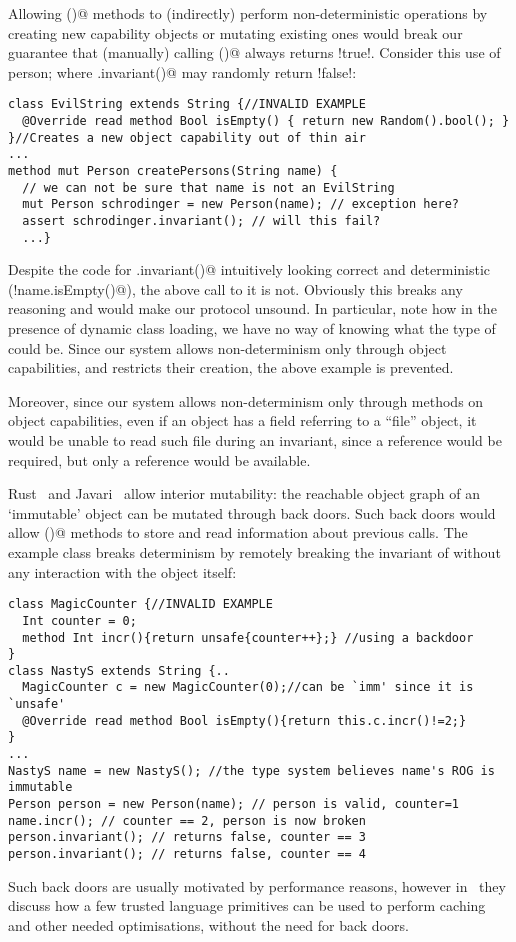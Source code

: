 Allowing \Q@invariant()@ methods to (indirectly) perform non-deterministic operations by creating new capability objects or mutating existing ones would break our guarantee that (manually) calling \Q@invariant()@ always returns \Q!true!.
Consider this use of person; where \Q@myPerson.invariant()@ may randomly return \Q!false!:
\begin{lstlisting}[morekeywords={assert}]
class EvilString extends String {//INVALID EXAMPLE
  @Override read method Bool isEmpty() { return new Random().bool(); }
}//Creates a new object capability out of thin air
...
method mut Person createPersons(String name) {
  // we can not be sure that name is not an EvilString
  mut Person schrodinger = new Person(name); // exception here?
  assert schrodinger.invariant(); // will this fail?
  ...}
\end{lstlisting}
Despite the code for \Q@Person.invariant()@ intuitively looking correct and deterministic (\Q@!name.isEmpty()@), the above call to it is not. Obviously this breaks any reasoning and would make our protocol unsound. 
In particular, note how in the presence of dynamic class loading, we have no way of knowing what the type of \Q@name@ could be. Since our system allows non-determinism only through object capabilities, and 
restricts their creation, the above example is prevented.

Moreover, since our system allows  
non-determinism only through \Q@mut@ methods on object capabilities, 
even if an object has a \Q@rep@ field referring to a ``file'' object, it would be unable to read such file during an invariant, since a \Q@mut@ reference would be required, but only a \Q@read@ reference would be available.

Rust~\cite{matsakis2014rust} and Javari~\cite{TschantzErnst05}
allow interior mutability:
the reachable object graph of an `immutable' object can be mutated through back doors.
Such back doors would allow \Q@invariant()@ methods to store and read information about previous calls.
The example class \Q@MagicCounter@ breaks determinism by
remotely breaking the invariant of \Q@person@ without any interaction with the \Q@person@ object itself:
\begin{lstlisting}
class MagicCounter {//INVALID EXAMPLE
  Int counter = 0;
  method Int incr(){return unsafe{counter++};} //using a backdoor
}
class NastyS extends String {..
  MagicCounter c = new MagicCounter(0);//can be `imm' since it is `unsafe'
  @Override read method Bool isEmpty(){return this.c.incr()!=2;}
}
...
NastyS name = new NastyS(); //the type system believes name's ROG is immutable
Person person = new Person(name); // person is valid, counter=1
name.incr(); // counter == 2, person is now broken
person.invariant(); // returns false, counter == 3
person.invariant(); // returns false, counter == 4
\end{lstlisting}
Such back doors are usually motivated by performance reasons, however in~\cite{GordonEtAl12} they
discuss how a few trusted language primitives can be used to perform caching and other needed optimisations,
without the need for back doors.


